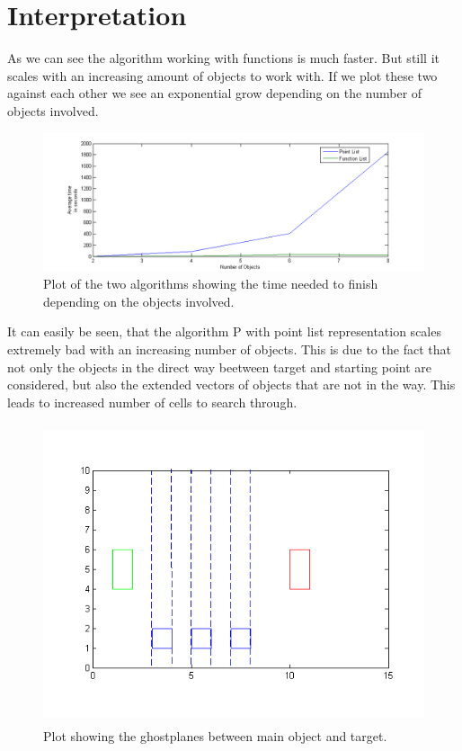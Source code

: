 

\section{Interpretation}
As we can see the algorithm working with functions is much faster. But still it scales with an increasing amount of objects to work with.
If we plot these two against each other we see an exponential grow depending on the number of objects involved.
\begin{figure}[H]
\includegraphics[width=\textwidth]{pointAgainstFunc.png}
\caption{ Plot of the two algorithms showing the time needed to finish depending on the objects involved.}
\end{figure}
It can easily be seen, that the algorithm P with point list representation scales extremely bad with an increasing number of objects. This is due to the fact that not only the objects in the direct way beetween target and starting point are considered, but also the extended vectors of objects that are not in the way. This leads to increased number of cells to search through.
\begin{figure}[H]
\centering
\includegraphics[width=\textwidth, height=250pt]{ghostplanesStep}
\caption{Plot showing the ghostplanes between main object and target.}
\end{figure}
